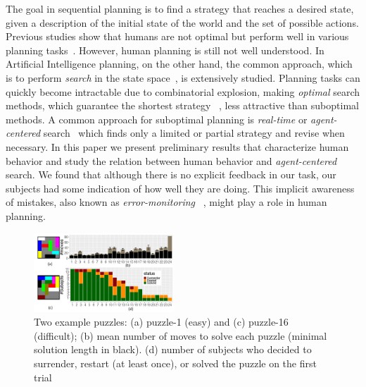 \documentclass[10pt,letterpaper]{article}
\begin{document}
The goal in sequential planning is to find a strategy that reaches a desired state, given a description of the initial state of the world and the set of possible actions. Previous studies show that humans are not optimal but perform well in various planning tasks~\cite{acuna2008bayesian,pizlo2005solving,macgregor1996human,van2016people}. However, human planning is still not well understood. In Artificial Intelligence planning, on the other hand, the common approach, which is to perform \emph{search} in the state space~\cite{russell1995modern}, is extensively studied. Planning tasks can quickly become intractable due to combinatorial explosion, making \emph{optimal} search methods, which guarantee the shortest strategy ~\cite{korf1985depth,hart1968formal}, less attractive than suboptimal methods. A common approach for suboptimal planning is \emph{real-time} or \emph{agent-centered} search~\cite{korf1990real,koenig2001agent} which finds only a limited or partial strategy and revise when necessary. In this paper we present preliminary results that characterize human behavior and study the relation between human behavior and \emph{agent-centered} search. We found that although there is no explicit feedback in our task, our subjects had some indication of how well they are doing. This implicit awareness of mistakes, also known as \emph{error-monitoring} ~\cite{yeung2012metacognition}, might play a role in human planning. 

\begin{figure}[ht]
	\centering
	\includegraphics[width=0.47\textwidth]{puzzle_j1.pdf}
\caption{ Two example puzzles: (a) puzzle-1 (easy) and (c) puzzle-16 (difficult); (b) mean number of moves to solve each puzzle (minimal solution length in black). (d) number of subjects who decided to surrender, restart (at least once), or solved the puzzle on the first trial}
	\label{fig:puzzle}
\vspace{-0.2cm}
\end{figure}
\end{document}
